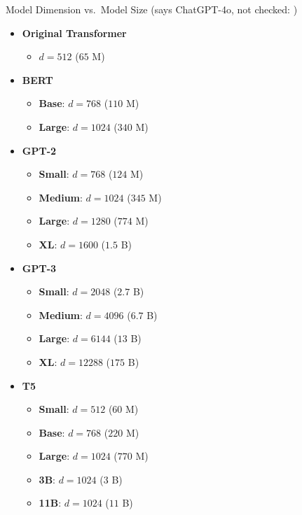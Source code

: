 \begin{slide}[\slideopts,toc={Model Dimension}]{Model Dimension vs.~Model Size
(says ChatGPT-4o, not checked: )}

\vspace{-2em}


\begin{multicols}{2}
\begin{itemize}
    \item \textbf{Original Transformer}
    \begin{itemize}
        \item $d = 512$ ($65$ M)
    \end{itemize}
    
    \item \textbf{BERT}
    \begin{itemize}
        \item \textbf{Base}: $d = 768$ ($110$ M)
        \item \textbf{Large}: $d = 1024$ ($340$ M)
    \end{itemize}
    
    \item \textbf{GPT-2}
    \begin{itemize}
        \item \textbf{Small}: $d = 768$ ($124$ M)
        \item \textbf{Medium}: $d = 1024$ ($345$ M)
        \item \textbf{Large}: $d = 1280$ ($774$ M)
        \item \textbf{XL}: $d = 1600$ ($1.5$ B)
    \end{itemize}
    
    \item \textbf{GPT-3}
    \begin{itemize}
        \item \textbf{Small}: $d = 2048$ ($2.7$ B)
        \item \textbf{Medium}: $d = 4096$ ($6.7$ B)
        \item \textbf{Large}: $d = 6144$ ($13$ B)
        \item \textbf{XL}: $d = 12288$ ($175$ B)
    \end{itemize}
    
    \item \textbf{T5}
    \begin{itemize}
        \item \textbf{Small}: $d = 512$ ($60$ M)
        \item \textbf{Base}: $d = 768$ ($220$ M)
        \item \textbf{Large}: $d = 1024$ ($770$ M)
        \item \textbf{3B}: $d = 1024$ ($3$ B)
        \item \textbf{11B}: $d = 1024$ ($11$ B)
    \end{itemize}
    

\end{itemize}
\end{multicols}
\end{slide}
